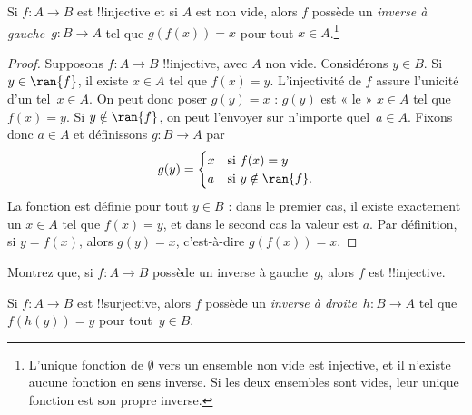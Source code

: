 \documentclass[../../../include/open-logic-section]{subfiles}
\begin{document}
\begin{prop}
Si $f\colon A \to B$ est !!{injective} et si $A$ est non vide,
alors $f$ possède un \emph{inverse à gauche}~$g\colon B \to A$ tel que
$g(f(x)) = x$ pour tout $x \in A$.\footnote{L’unique fonction de
$\emptyset$ vers un ensemble non vide est injective, et il n’existe
aucune fonction en sens inverse. Si les deux ensembles sont vides,
leur unique fonction est son propre inverse.}
%
\end{prop}

\begin{proof}
Supposons $f\colon A \to B$ !!{injective}, avec $A$ non vide.
Considérons $y \in B$. Si $y \in \ran{f}$, il existe $x \in A$ tel que
$f(x) = y$. L’injectivité de $f$ assure l’unicité d’un tel~$x \in A$.
On peut donc poser $g(y) = x$ : $g(y)$ est « le » $x \in A$ tel que
$f(x) = y$. Si $y \notin \ran{f}$, on peut l’envoyer sur n’importe
quel~$a \in A$. Fixons donc $a \in A$ et définissons $g\colon B \to A$ par
\[
g(y) = \begin{cases}
    x & \text{si $f(x) = y$}\\
    a & \text{si $y \notin \ran{f}$.}
\end{cases}
\]
La fonction est définie pour tout $y \in B$ : dans le premier cas,
il existe exactement un $x \in A$ tel que $f(x) = y$, et dans le second
cas la valeur est $a$. Par définition, si $y = f(x)$, alors $g(y) = x$,
c’est-à-dire $g(f(x)) = x$.
\end{proof}

\begin{prob}
Montrez que, si $f\colon A \to B$ possède un inverse à gauche~$g$,
alors $f$ est !!{injective}.
\end{prob}

\begin{prop}
Si $f\colon A \to B$ est !!{surjective}, alors $f$ possède un
\emph{inverse à droite}~$h\colon B \to A$ tel que $f(h(y)) = y$
pour tout~$y \in B$.
\end{prop}
\end{document}
